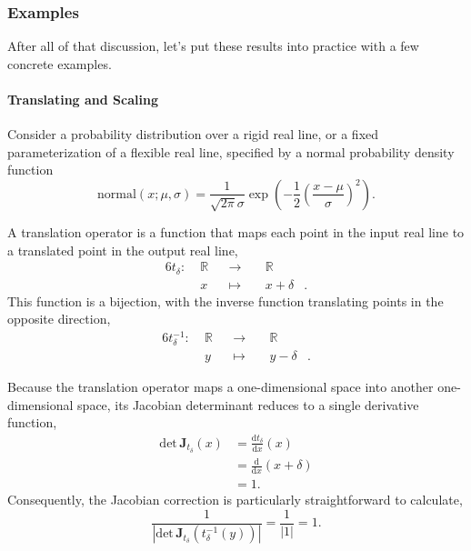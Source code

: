 \documentclass[
  letterpaper,
  DIV=11,
  numbers=noendperiod]{scrartcl}
\let\oldparagraph\paragraph
\renewcommand{\paragraph}[1]{\oldparagraph{#1}\mbox{}}
\begin{document}
\subsubsection{Examples}\label{examples}

After all of that discussion, let's put these results into practice with
a few concrete examples.

\paragraph{Translating and Scaling}\label{translating-and-scaling}

Consider a probability distribution over a rigid real line, or a fixed
parameterization of a flexible real line, specified by a normal
probability density function \[
\mathrm{normal}(x; \mu, \sigma)
=
\frac{1}{\sqrt{2 \pi} \sigma}
\exp \left(
-\frac{1}{2} \left( \frac{ x - \mu}{\sigma} \right)^{2}
\right).
\]

A translation operator is a function that maps each point in the input
real line to a translated point in the output real line,
\begin{alignat*}{6}
t_{\delta} :\; & \mathbb{R} & &\rightarrow& \; & \mathbb{R} &
\\
& x & &\mapsto& & x + \delta &.
\end{alignat*} This function is a bijection, with the inverse function
translating points in the opposite direction, \begin{alignat*}{6}
t_{\delta}^{-1} :\; & \mathbb{R} & &\rightarrow& \; & \mathbb{R} &
\\
& y & &\mapsto& & y - \delta &.
\end{alignat*}

Because the translation operator maps a one-dimensional space into
another one-dimensional space, its Jacobian determinant reduces to a
single derivative function, \begin{align*}
\mathrm{det} \,  \mathbf{J}_{t_{\delta}}(x)
&= \frac{ \mathrm{d} t_{\delta} }{ \mathrm{d} x }(x)
\\
&= \frac{ \mathrm{d} }{ \mathrm{d} x } ( x + \delta )
\\
&= 1.
\end{align*} Consequently, the Jacobian correction is particularly
straightforward to calculate, \[
\frac{1}
{| \mathrm{det} \, \mathbf{J}_{t_{\delta}}(t_{\delta}^{-1}(y)) |}
=
\frac{1}{ | 1 | }
=
1.
\]
\end{document}
